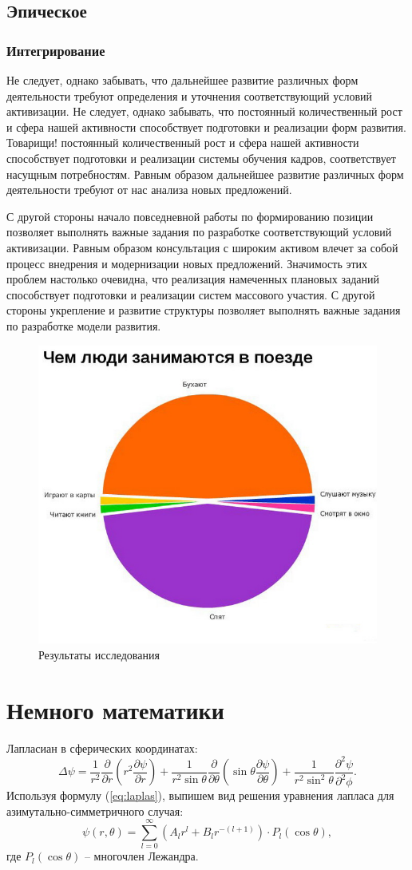 \documentclass[14pt,final,titlepage]{hedsemwork}
\begin{document}
\subsection{Эпическое}
\subsubsection{Интегрирование}
Не следует, однако забывать, что дальнейшее развитие различных форм деятельности требуют определения и уточнения соответствующий условий активизации. Не следует, однако забывать, что постоянный количественный рост и сфера нашей активности способствует подготовки и реализации форм развития. Товарищи! постоянный количественный рост и сфера нашей активности способствует подготовки и реализации системы обучения кадров, соответствует насущным потребностям. Равным образом дальнейшее развитие различных форм деятельности требуют от нас анализа новых предложений.

С другой стороны начало повседневной работы по формированию позиции позволяет выполнять важные задания по разработке соответствующий условий активизации. Равным образом консультация с широким активом влечет за собой процесс внедрения и модернизации новых предложений. Значимость этих проблем настолько очевидна, что реализация намеченных плановых заданий способствует подготовки и реализации систем массового участия. С другой стороны укрепление и развитие структуры позволяет выполнять важные задания по разработке модели развития.
\begin{figure}[b]
    \center
    \includegraphics[width=.47\textwidth]{2.jpg}
    \caption{Результаты исследования}
\end{figure}

\section{Немного математики}
Лапласиан в сферических координатах:
\begin{equation}
    \Delta\psi = \frac{1}{r^2}\frac{\partial}{\partial r}
    \left( r^2 \frac{\partial \psi}{\partial r} \right) +
    \frac{1}{r^2\sin\theta}\frac{\partial}{\partial\theta}
    \left(\sin\theta\frac{\partial\psi}{\partial\theta}\right) +
    \frac{1}{r^2\sin^2\theta}\frac{\partial^2\psi}{\partial^2\phi}.
    \label{eq:laplas}
\end{equation}
Используя формулу (\ref{eq:laplas}), выпишем вид решения уравнения лапласа для
азимутально-симметричного случая:
\begin{equation}
    \psi(r,\theta) = \sum_{l=0}^\infty\left(A_lr^l + B_lr^{-(l+1)}\right)\cdot
    P_l(\cos\theta),
\end{equation}
где \(P_l(\cos\theta)\) -- многочлен Лежандра.
\end{document}

